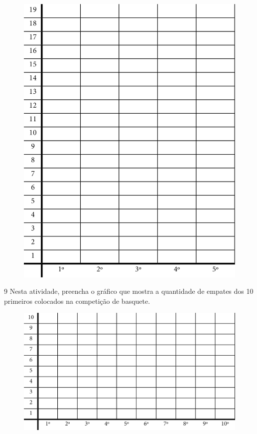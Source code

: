 \begin{figure}[htpb!]
\centering
\includegraphics[width=\textwidth]{./media/image96.png}
\end{figure}


\pagebreak
\num{9} Nesta atividade, preencha o gráfico que mostra a quantidade de empates
dos 10 primeiros colocados na competição de basquete.

\begin{figure}[htpb!]
\includegraphics[width=\textwidth]{./media/image97.png}
\end{figure}

